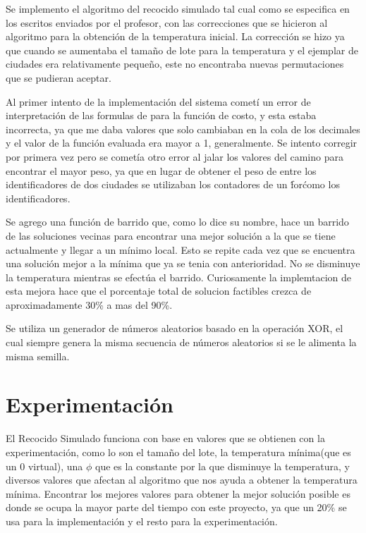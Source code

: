 \documentclass[12pt]{article}
\begin{document}
Se implemento el algoritmo del recocido simulado tal cual como se especifica en los escritos enviados por el profesor, con las correcciones que se hicieron al algoritmo para la obtención de la temperatura inicial. La corrección se hizo ya que cuando se aumentaba el tamaño de lote para la temperatura y el ejemplar de ciudades era relativamente pequeño, este no encontraba nuevas permutaciones que se pudieran aceptar.

Al primer intento de la implementación del sistema cometí un error de interpretación de las formulas de para la función de costo, y esta estaba incorrecta, ya que me daba valores que solo cambiaban en la cola de los decimales y el valor de la función evaluada era mayor a 1, generalmente. Se intento corregir por primera vez pero se cometía otro error al jalar los valores del camino para encontrar el mayor peso, ya que en lugar de obtener el peso de entre los identificadores de dos ciudades se utilizaban los contadores de un \'for\' como los identificadores.

Se agrego una función de barrido que, como lo dice su nombre, hace un barrido de las soluciones vecinas para encontrar una mejor solución a la que se tiene actualmente y llegar a un mínimo local. Esto se repite cada vez que se encuentra una solución mejor a  la mínima que ya se tenia con anterioridad. No se disminuye la temperatura mientras se efectúa el barrido. Curiosamente la implemtacion de esta mejora hace que el porcentaje total de solucion factibles crezca de aproximadamente 30\% a mas del 90\%.

Se utiliza un generador de números aleatorios basado en la operación XOR, el cual siempre genera la misma secuencia de números aleatorios si se le alimenta la misma semilla.


\section{Experimentación}

El Recocido Simulado funciona con base en valores que se obtienen con la experimentación, como lo son el tamaño del lote, la temperatura mínima(que es un 0 virtual), una $\phi$ que es la constante por la que disminuye la temperatura, y diversos valores que afectan al algoritmo que nos ayuda a obtener la temperatura mínima. Encontrar los mejores valores para obtener la mejor solución posible es donde se ocupa la mayor parte del tiempo con este proyecto, ya que un 20\% se usa para la implementación y el resto para la experimentación.
\end{document}

